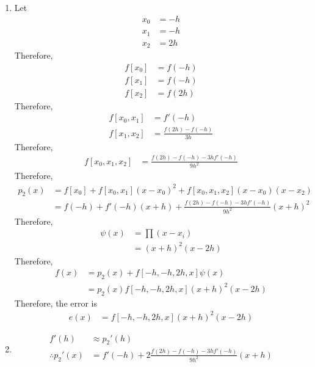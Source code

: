 \documentclass[fleqn, a4paper, 12pt, twoside]{article}
\theoremstyle{definition}
\theoremstyle{theorem}
\begin{document}
\begin{solution}
	\begin{enumerate}[leftmargin=*]
		\item
			Let
			\begin{align*}
				x_0 & = -h \\
				x_1 & = -h \\
				x_2 & = 2 h
			\end{align*}
			Therefore,
			\begin{align*}
				f[x_0] & = f(-h) \\
				f[x_1] & = f(-h) \\
				f[x_2] & = f(2 h)
			\end{align*}
			Therefore,
			\begin{align*}
				f[x_0,x_1] & = f'(-h) \\
				f[x_1,x_2] & = \frac{f(2 h) - f(-h)}{3 h}
			\end{align*}
			Therefore,
			\begin{align*}
				f[x_0,x_1,x_2] & = \frac{f(2 h) - f(-h) - 3 h f'(-h)}{9 h^2}
			\end{align*}
			Therefore,
			\begin{align*}
				p_2(x) & = f[x_0] + f[x_0,x_1] (x - x_0)^2 + f[x_0,x_1,x_2] (x - x_0) (x - x_2) \\
                                       & = f(-h) + f'(-h) (x + h) + \frac{f(2 h) - f(-h) - 3 h f'(-h)}{9 h^2} (x + h)^2
			\end{align*}
			Therefore,
			\begin{align*}
				\psi(x) & = \prod (x - x_i) \\
                                        & = (x + h)^2 (x - 2 h)
			\end{align*}
			Therefore,
			\begin{align*}
				f(x) & = p_2(x) + f[-h,-h,2 h,x] \psi(x) \\
                                     & = p_2(x) f[-h,-h,2 h,x] (x + h)^2 (x - 2 h)
			\end{align*}
			Therefore, the error is
			\begin{align*}
				e(x) & = f[-h,-h,2 h,x] (x + h)^2 (x - 2 h)
			\end{align*}
		\item
			\begin{align*}
				f'(h)                & \approx {p_2}'(h)                                              \\
				\therefore {p_2}'(x) & = f'(-h) + 2 \frac{f(2 h) - f(-h) - 3 h f'(-h)}{9 h^2} (x + h) \\

\end{align*}
\end{enumerate}
\end{solution}
\end{document}
